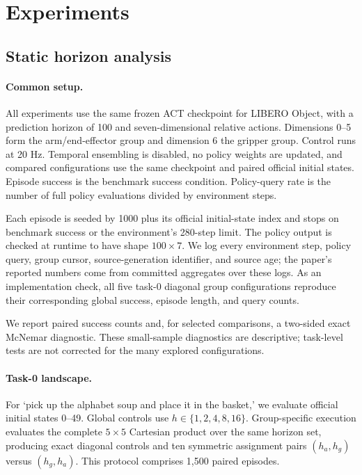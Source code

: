\section{Experiments}
\label{sec:experiments}

\subsection{Static horizon analysis}

\paragraph{Common setup.}

All experiments use the same frozen ACT checkpoint for LIBERO Object, with a
prediction horizon of 100 and seven-dimensional relative actions.  Dimensions
0--5 form the arm/end-effector group and dimension 6 the gripper group.  Control
runs at 20 Hz.  Temporal ensembling is disabled, no policy weights are updated,
and compared configurations use the same checkpoint and paired official initial
states.  Episode success is the benchmark success condition.  Policy-query rate
is the number of full policy evaluations divided by environment steps.

Each episode is seeded by 1000 plus its official initial-state index and stops on
benchmark success or the environment's 280-step limit.  The policy output is
checked at runtime to have shape $100\!\times\!7$.  We log every environment
step, policy query, group cursor, source-generation identifier, and source age;
the paper's reported numbers come from committed aggregates over these logs.
As an implementation check, all five task-0 diagonal group configurations
reproduce their corresponding global success, episode length, and query counts.

We report paired success counts and, for selected comparisons, a two-sided exact
McNemar diagnostic.  These small-sample diagnostics are descriptive; task-level
tests are not corrected for the many explored configurations.

\paragraph{Task-0 landscape.}

For `pick up the alphabet soup and place it in the basket,' we evaluate official
initial states 0--49.  Global controls use
$h\in\{1,2,4,8,16\}$.  Group-specific execution evaluates the complete
$5\!\times\!5$ Cartesian product over the same horizon set, producing exact
diagonal controls and ten symmetric assignment pairs $(h_a,h_g)$ versus
$(h_g,h_a)$.  This protocol comprises 1,500 paired episodes.

